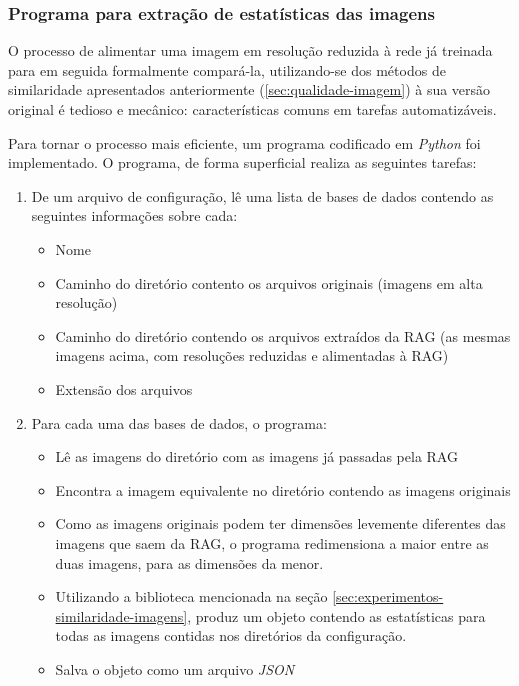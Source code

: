 \subsubsection{Programa para extração de estatísticas das imagens}
\label{sec:programa-extracao-estatisticas-imagem}

O processo de alimentar uma imagem em resolução reduzida à rede já treinada para em seguida formalmente compará-la, utilizando-se dos métodos de similaridade apresentados anteriormente (\ref{sec:qualidade-imagem}) à sua versão original é tedioso e mecânico: características comuns em tarefas automatizáveis.

Para tornar o processo mais eficiente, um programa codificado em \textit{Python} foi implementado. O programa, de forma superficial realiza as seguintes tarefas:

\begin{enumerate}
    \item De um arquivo de configuração, lê uma lista de bases de dados contendo as seguintes informações sobre cada:
    \begin{itemize}
        \item Nome
        \item Caminho do diretório contento os arquivos originais (imagens em alta resolução)
        \item Caminho do diretório contendo os arquivos extraídos da RAG (as mesmas imagens acima, com resoluções reduzidas e alimentadas à RAG)
        \item Extensão dos arquivos
    \end{itemize}
    \item Para cada uma das bases de dados, o programa:
    \begin{itemize}
        \item Lê as imagens do diretório com as imagens já passadas pela RAG
        \item Encontra a imagem equivalente no diretório contendo as imagens originais
        \item Como as imagens originais podem ter dimensões levemente diferentes das imagens que saem da RAG, o programa redimensiona a maior entre as duas imagens, para as dimensões da menor.
        \item Utilizando a biblioteca mencionada na seção \ref{sec:experimentos-similaridade-imagens}, produz um objeto contendo as estatísticas para todas as imagens contidas nos diretórios da configuração.
        \item Salva o objeto como um arquivo \textit{JSON}
    \end{itemize}
\end{enumerate}

